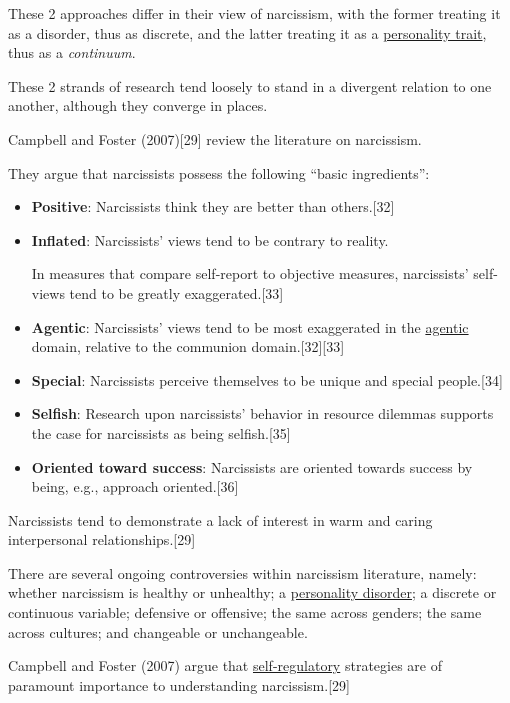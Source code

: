 \documentclass[oneside]{book}
\numberwithin{equation}{section}
\begin{document}
%
These 2 approaches differ in their view of narcissism, with the former treating it as a disorder, thus as discrete, and the latter treating it as a \href{https://en.wikipedia.org/wiki/Personality_trait}{personality trait}, thus as a \textit{continuum}.

These 2 strands of research tend loosely to stand in a divergent relation to one another, although they converge in places.

%
Campbell and Foster (2007)[29] review the literature on narcissism.

They argue that narcissists possess the following ``basic ingredients'':
\begin{itemize}
    \item \textbf{Positive}: Narcissists think they are better than others.[32]
    \item \textbf{Inflated}: Narcissists' views tend to be contrary to reality.
    
    In measures that compare self-report to objective measures, narcissists' self-views tend to be greatly exaggerated.[33]
    \item \textbf{Agentic}: Narcissists' views tend to be most exaggerated in the \href{https://en.wikipedia.org/wiki/Agentic}{agentic} domain, relative to the communion domain.[32][33]
    \item \textbf{Special}: Narcissists perceive themselves to be unique and special people.[34]
    \item \textbf{Selfish}: Research upon narcissists' behavior in resource dilemmas supports the case for narcissists as being selfish.[35]
    \item \textbf{Oriented toward success}: Narcissists are oriented towards success by being, e.g., approach oriented.[36]
\end{itemize}
Narcissists tend to demonstrate a lack of interest in warm and caring interpersonal relationships.[29]

There are several ongoing controversies within narcissism literature, namely: whether narcissism is healthy or unhealthy; a \href{https://en.wikipedia.org/wiki/Personality_disorder}{personality disorder}; a discrete or continuous variable; defensive or offensive; the same across genders; the same across cultures; and changeable or unchangeable.

%
Campbell and Foster (2007) argue that \href{https://en.wikipedia.org/wiki/Self_control}{self-regulatory} strategies are of paramount importance to understanding narcissism.[29]
\end{document}
